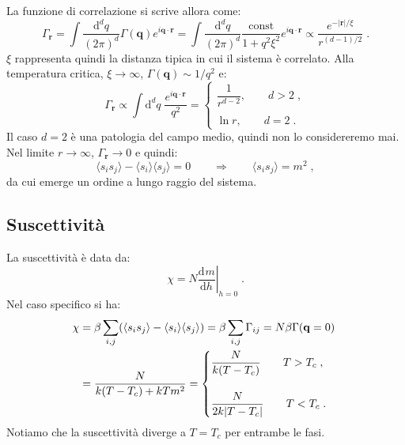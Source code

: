 \documentclass[10pt,a4paper]{report}
\theoremstyle{definition}
\newcommand{\dev}[3][]{\frac{\mathrm{d}^{#1} #2}{\mathrm{d} #3^{#1}}}
\numberwithin{equation}{section}
\newcommand{\diff}[1][]{\mathrm{d}#1}
\newcommand{\bra}{\langle}
\newcommand{\ket}{\rangle}
\begin{document}
La funzione di correlazione si scrive allora come:
\begin{equation}
\Gamma_{\mathbf{r}}=\int\frac{\diff^d{q}}{(2\pi)^d}\Gamma(\mathbf{q})e^{i\mathbf{q}\cdot\mathbf{r}}=\int\frac{\diff^d{q}}{(2\pi)^d}\frac{\mathrm{const}}{1+q^2\xi^2}e^{i\mathbf{q}\cdot\mathbf{r}}\propto \frac{e^{-|\mathbf{r}|/\xi}}{r^{(d-1)/2}}\;.
\end{equation}
$\xi$ rappresenta quindi la distanza tipica in cui il sistema è correlato. Alla temperatura critica, $\xi\to\infty$, $\Gamma(\mathbf{q})\sim 1/q^2$ e:
$$
\Gamma_{\mathbf{r}}\propto\int \diff^d{q}\;\frac{e^{i\mathbf{q}\cdot\mathbf{r}}}{q^2}=\begin{cases}
\dfrac{1}{r^{d-2}},\qquad d>2\;, \\
\\
\ln r,\qquad d=2\;.
\end{cases}
$$
Il caso $d=2$ è una patologia del campo medio, quindi non lo considereremo mai. Nel limite $r\to\infty$, $\Gamma_{\mathbf{r}}\to 0$ e quindi:
$$
\bra s_is_j\ket-\bra s_i\ket\bra s_j\ket=0\qquad \Longrightarrow\qquad \bra s_is_j\ket=m^2\;,
$$
da cui emerge un ordine a lungo raggio del sistema.
\subsection{Suscettività}
La suscettività è data da:
$$
\chi=N\left.\dev{m}{h}\right|_{h=0}\;.
$$
Nel caso specifico si ha:
\begin{align}
\chi &=\beta\sum_{i,j}(\bra s_is_j\ket-\bra s_i\ket\bra s_j\ket)=\beta\sum_{i,j}\Gamma_{ij}=N\beta\Gamma(\mathbf{q}=0) \notag \\
&=\frac{N}{k(T-T_c)+kTm^2}=\begin{cases}
\dfrac{N}{k(T-T_c)}\qquad T>T_c\;, \\
\\
\dfrac{N}{2k|T-T_c|}\qquad T<T_c\;.
\end{cases}
\end{align}
Notiamo che la suscettività diverge a $T=T_c$ per entrambe le fasi.
\end{document}
